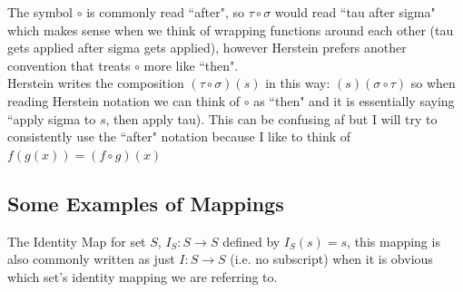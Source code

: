 \newpage
\begin{notation}
The symbol $\circ$ is commonly read ``after", so $\tau \circ \sigma$ would read ``tau after sigma" which makes sense when we think of wrapping functions around each other (tau gets applied after sigma gets applied), however Herstein prefers another convention that treats $\circ$ more like ``then".\steezybreak\\
Herstein writes the composition $(\tau \circ \sigma)(s)$ in this way: $ (s)(\sigma \circ \tau)$ so when reading Herstein notation we can think of $\circ$ as ``then" and it is essentially saying ``apply sigma to $s$, then apply tau). This can be confusing af but I will try to consistently use the ``after" notation because I like to think of $f(g(x))=(f\circ g) (x)$
\end{notation}

\subsection{Some Examples of Mappings}
\begin{example}
The Identity Map for set $S$,  $I_S: S\rightarrow S$ defined by $I_S(s)=s$, this mapping is also commonly written as just $I: S\rightarrow S$ (i.e. no subscript) when it is obvious which set's identity mapping we are referring to.
\end{example}

